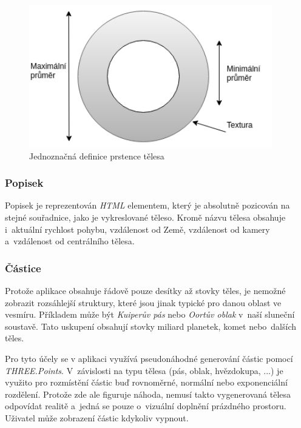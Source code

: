 \documentclass[a4paper,12pt]{article}
\begin{document}
\begin{figure}[H]
\begin{center}
\includegraphics[width=300pt]{Images/RingData.png}
\caption[Jednoznačná definice prstence tělesa]{Jednoznačná definice prstence tělesa \footnotemark[1]}
\end{center}
\end{figure}


\subsubsection{Popisek}

Popisek je reprezentován \textit{HTML} elementem, který je absolutně pozicován na stejné souřadnice, jako je vykreslované těleso. Kromě názvu tělesa obsahuje i~aktuální rychlost pohybu, vzdálenost od Země, vzdálenost od kamery a~vzdálenost od centrálního tělesa.

\subsubsection{Částice}
Protože aplikace obsahuje řádově pouze desítky až stovky těles, je nemožné zobrazit rozsáhlejší struktury, které jsou jinak typické pro danou oblast ve vesmíru. Příkladem může být \textit{Kuiperův pás} nebo \textit{Oortův oblak} v~naší sluneční soustavě. Tato uskupení obsahují stovky miliard planetek, komet nebo~dalších těles. \cite{kleczek}

Pro tyto účely se v aplikaci využívá pseudonáhodné generování částic pomocí \textit{THREE.Points}. V~závislosti na typu tělesa (pás, oblak, hvězdokupa, ...) je využito pro rozmístění částic buď rovnoměrné, normální nebo exponenciální rozdělení.  Protože zde ale figuruje náhoda, nemusí takto vygenerovaná tělesa odpovídat realitě a~jedná se pouze o~vizuální doplnění prázdného prostoru. Uživatel může zobrazení částic kdykoliv vypnout.
\end{document}
